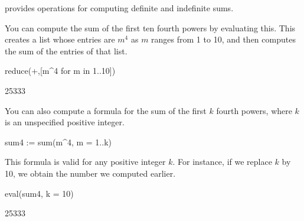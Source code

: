 {{{{{{{{{{{{{{{{%

\Language{} provides operations for computing definite and
indefinite sums.

\begin{xtc}
\begin{xtccomment}
You can compute the sum of the first
ten fourth powers by evaluating this.
This creates a list whose entries are
$m^4$ as $m$ ranges from 1
to 10, and then computes the sum of the entries of that list.
\end{xtccomment}
\begin{spadsrc}
reduce(+,[m^4 for m in 1..10])
\end{spadsrc}
\begin{TeXOutput}
\begin{fricasmath}{1}
25333%
\end{fricasmath}
\end{TeXOutput}
\end{xtc}
\begin{xtc}
\begin{xtccomment}
You can also compute a formula for the sum of the first
$k$ fourth powers, where $k$ is an
unspecified positive integer.
\end{xtccomment}
\begin{spadsrc}
sum4 := sum(m^4, m = 1..k) 
\end{spadsrc}
\begin{TeXOutput}
\begin{fricasmath}{2}
%
\end{fricasmath}
\end{TeXOutput}
\end{xtc}
\begin{xtc}
\begin{xtccomment}
This formula is valid for any positive integer $k$.
For instance, if we replace $k$ by 10,
we obtain the number we computed earlier.
\end{xtccomment}
\begin{spadsrc}
eval(sum4, k = 10) 
\end{spadsrc}
\begin{TeXOutput}
\begin{fricasmath}{3}
25333%
\end{fricasmath}
\end{TeXOutput}
\end{xtc}

}}}}}}}}}}}}}}}}

